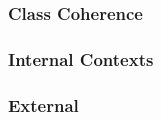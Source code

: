 \documentclass[../ThesisDoc]{subfiles}
\begin{document}
\newcommand{\seccmd}[1]{\secpartc{#1}}
\subsubsection{Class Coherence}

\subsubsection{Internal Contexts}

\subsubsection{External}

\end{document}
